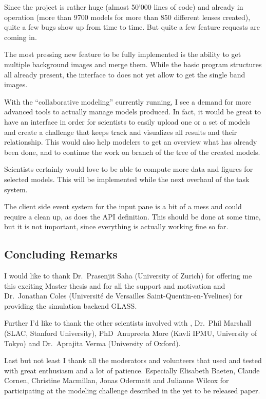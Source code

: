 Since the project is rather huge (almost 50'000 lines of code) and already in operation (more than 9700 models for more than 850 different lenses created), quite a few bugs show up from time to time.
But quite a few feature requests are coming in.

The most pressing new feature to be fully implemented is the ability to get multiple background images and merge them.
While the basic program structures all already present, the interface to \sw does not yet allow to get the single band images.

With the ``collaborative modeling'' currently running, I see a demand for more advanced tools to actually manage models produced.
In fact, it would be great to have an interface in order for scientists to easily upload one or a set of models and create a challenge that keeps track and visualizes all results and their relationship.
This would also help modelers to get an overview what has already been done, and to continue the work on branch of the tree of the created models.

Scientists certainly would love to be able to compute more data and figures for selected models.
This will be implemented while the next overhaul of the task system.

The client side event system for the input pane is a bit of a mess and could require a clean up, as does the API definition.
This should be done at some time, but it is not important, since everything is actually working fine so far.


\subsection{Concluding Remarks}

I would like to thank Dr.~Prasenjit Saha (University of Zurich) for offering me this exciting Master thesis and for all the support and motivation and Dr.~Jonathan Coles (Université de Versailles Saint-Quentin-en-Yvelines) for providing the simulation backend GLASS.

Further I'd like to thank the other scientists involved with \sw, Dr.~Phil Marshall (SLAC, Stanford University), PhD~Anupreeta More (Kavli IPMU, University of Tokyo) and Dr.~Aprajita Verma (University of Oxford).

Last but not least I thank all the \sw moderators and volunteers that used and tested \spl with great enthusiasm and a lot of patience. Especially Elisabeth Baeten, Claude Cornen, Christine Macmillan, Jonas Odermatt and Julianne Wilcox for participating at the modeling challenge described in the yet to be released paper.